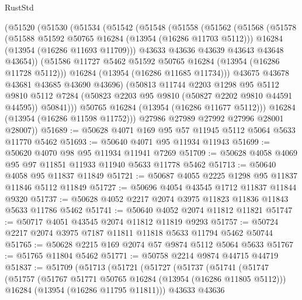 \begin{lexlean}{RustStd}
\begin{coremodule}
        (@51520
          (@51530
            (@51534
              (@51542
                (@51548
                  (@51558
                    (@51562
                      (@51568
                        (@51578
                          (@51588 @51592 @50765 @16284 (@13954 (@16286 @11703 @5112)))
                          @16284
                          (@13954 (@16286 @11693 @11709)))
                        @43633
                        @43636
                        @43639
                        @43643
                        @43648
                        @43654))
                    (@51586 @11727 @5462 @51592 @50765 @16284 (@13954 (@16286 @11728 @5112)))
                    @16284
                    (@13954 (@16286 @11685 @11734)))
                  @43675
                  @43678
                  @43681
                  @43685
                  @43690
                  @43696)
                (@50813
                  @11744
                  @2203
                  @1298
                  @95
                  @5112
                  @9810
                  @5112
                  @7284
                  (@50823 @2203 @95 @9810 (@50827 @2202 @9810 @44591 @44595))
                  @50841)))
            @50765
            @16284
            (@13954 (@16286 @11677 @5112)))
          @16284
          (@13954 (@16286 @11598 @11752)))
        @27986
        @27989
        @27992
        @27996
        @28001
        @28007))
@51689 := @50628 @4071 @169 @95 @57 @11945 @5112 @5064 @5633 @11770 @5462
@51693 := @50640 @4071 @95 @11934 @11943
@51699 := @50620 @4070 @98 @95 @11934 @11941 @7269
@51709 := @50628 @4058 @4069 @95 @97 @11851 @11933 @11940 @5633 @11778 @5462
@51713 := @50640 @4058 @95 @11837 @11849
@51721 := @50687 @4055 @2225 @1298 @95 @11837 @11846 @5112 @11849
@51727 := @50696 @4054 @43545 @1712 @11837 @11844 @9320
@51737 := @50628 @4052 @2217 @2074 @3975 @11823 @11836 @11843 @5633 @11786 @5462
@51741 := @50640 @4052 @2074 @11812 @11821
@51747 := @50717 @4051 @43545 @2074 @11812 @11819 @9293
@51757 := @50724 @2217 @2074 @3975 @7187 @11811 @11818 @5633 @11794 @5462 @50744
@51765 := @50628 @2215 @169 @2074 @57 @9874 @5112 @5064 @5633
@51767 := @51765 @11804 @5462
@51771 := @50758 @2214 @9874 @44715 @44719
@51837 := @51709
    (@51713
      (@51721
        (@51727
          (@51737
            (@51741
              (@51747
                (@51757
                  (@51767 @51771 @50765 @16284 (@13954 (@16286 @11805 @5112)))
                  @16284
                  (@13954 (@16286 @11795 @11811)))
                @43633
                @43636

\end{coremodule}
\end{lexlean}
